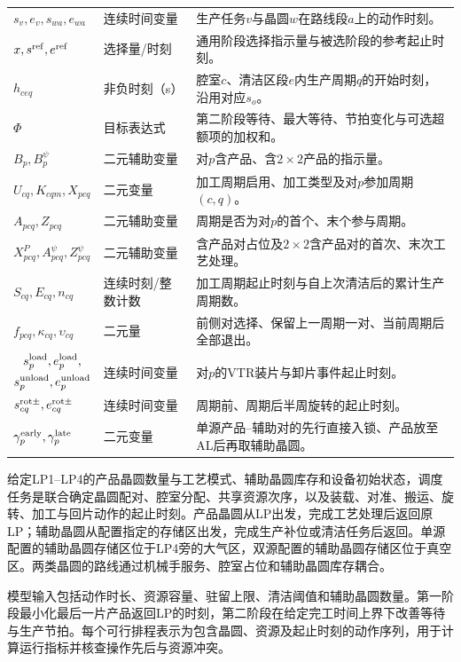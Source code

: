 \documentclass[final,5p,times,twocolumn]{elsarticle}
\begin{document}
\begin{table}[t]
\begin{tabular}{C{0.20\textwidth}C{0.16\textwidth}C{0.43\textwidth}}
$s_v,e_v,s_{wa},e_{wa}$ & 连续时间变量 & 生产任务$v$与晶圆$w$在路线段$a$上的动作时刻。\\
$x,s^{\rm ref},e^{\rm ref}$ & 选择量/时刻 & 通用阶段选择指示量与被选阶段的参考起止时刻。\\
$h_{ceq}$ & 非负时刻（s） & 腔室$c$、清洁区段$e$内生产周期$q$的开始时刻，沿用对应$s_o$。\\
$\Phi$ & 目标表达式 & 第二阶段等待、最大等待、节拍变化与可选超额项的加权和。\\
$B_p,B_p^{\psi}$ & 二元辅助变量 & 对$p$含产品、含$2\times2$产品的指示量。\\
$U_{cq},K_{cqm},X_{pcq}$ & 二元变量 & 加工周期启用、加工类型及对$p$参加周期$(c,q)$。\\
$A_{pcq},Z_{pcq}$ & 二元辅助变量 & 周期是否为对$p$的首个、末个参与周期。\\
$X^P_{pcq},A^{\psi}_{pcq},Z^{\psi}_{pcq}$ & 二元辅助变量 & 含产品对占位及$2\times2$含产品对的首次、末次工艺处理。\\
$S_{cq},E_{cq},n_{cq}$ & 连续时刻/整数计数 & 加工周期起止时刻与自上次清洁后的累计生产周期数。\\
$f_{pcq},\kappa_{cq},\upsilon_{cq}$ & 二元量 & 前侧对选择、保留上一周期一对、当前周期后全部退出。\\
$\begin{gathered}s^{\rm load}_p,e^{\rm load}_p,\\s^{\rm unload}_p,e^{\rm unload}_p\end{gathered}$ & 连续时间变量 & 对$p$的VTR装片与卸片事件起止时刻。\\
$s^{\rm rot\pm}_{cq},e^{\rm rot\pm}_{cq}$ & 连续时间变量 & 周期前、周期后半周旋转的起止时刻。\\
$\gamma^{\rm early}_p,\gamma^{\rm late}_p$ & 二元变量 & 单源产品--辅助对的先行直接入锁、产品放至AL后再取辅助晶圆。\\
\bottomrule
\end{tabular}
\end{table}


给定LP1--LP4的产品晶圆数量与工艺模式、辅助晶圆库存和设备初始状态，调度任务是联合确定晶圆配对、腔室分配、共享资源次序，以及装载、对准、搬运、旋转、加工与回片动作的起止时刻。产品晶圆从LP出发，完成工艺处理后返回原LP；辅助晶圆从配置指定的存储区出发，完成生产补位或清洁任务后返回。单源配置的辅助晶圆存储区位于LP4旁的大气区，双源配置的辅助晶圆存储区位于真空区。两类晶圆的路线通过机械手服务、腔室占位和辅助晶圆库存耦合。

模型输入包括动作时长、资源容量、驻留上限、清洁阈值和辅助晶圆数量。第一阶段最小化最后一片产品返回LP的时刻，第二阶段在给定完工时间上界下改善等待与生产节拍。每个可行排程表示为包含晶圆、资源及起止时刻的动作序列，用于计算运行指标并核查操作先后与资源冲突。
\end{document}
